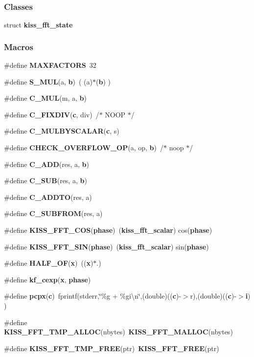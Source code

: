 \subsubsection*{Classes}
\begin{DoxyCompactItemize}
\item 
struct {\bf kiss\+\_\+fft\+\_\+state}
\end{DoxyCompactItemize}
\subsubsection*{Macros}
\begin{DoxyCompactItemize}
\item 
\#define {\bf M\+A\+X\+F\+A\+C\+T\+O\+RS}~32
\item 
\#define {\bf S\+\_\+\+M\+UL}(a,  {\bf b})~( (a)$\ast$({\bf b}) )
\item 
\#define {\bf C\+\_\+\+M\+UL}(m,  a,  {\bf b})
\item 
\#define {\bf C\+\_\+\+F\+I\+X\+D\+IV}({\bf c},  div)~/$\ast$ N\+O\+OP $\ast$/
\item 
\#define {\bf C\+\_\+\+M\+U\+L\+B\+Y\+S\+C\+A\+L\+AR}({\bf c},  s)
\item 
\#define {\bf C\+H\+E\+C\+K\+\_\+\+O\+V\+E\+R\+F\+L\+O\+W\+\_\+\+OP}(a,  op,  {\bf b})~/$\ast$ noop $\ast$/
\item 
\#define {\bf C\+\_\+\+A\+DD}(res,  a,  {\bf b})
\item 
\#define {\bf C\+\_\+\+S\+UB}(res,  a,  {\bf b})
\item 
\#define {\bf C\+\_\+\+A\+D\+D\+TO}(res,  a)
\item 
\#define {\bf C\+\_\+\+S\+U\+B\+F\+R\+OM}(res,  a)
\item 
\#define {\bf K\+I\+S\+S\+\_\+\+F\+F\+T\+\_\+\+C\+OS}({\bf phase})~({\bf kiss\+\_\+fft\+\_\+scalar}) cos({\bf phase})
\item 
\#define {\bf K\+I\+S\+S\+\_\+\+F\+F\+T\+\_\+\+S\+IN}({\bf phase})~({\bf kiss\+\_\+fft\+\_\+scalar}) sin({\bf phase})
\item 
\#define {\bf H\+A\+L\+F\+\_\+\+OF}({\bf x})~(({\bf x})$\ast$.)
\item 
\#define {\bf kf\+\_\+cexp}({\bf x},  {\bf phase})
\item 
\#define {\bf pcpx}({\bf c})~fprintf(stderr,\char`\"{}\%g + \%gi\textbackslash{}n\char`\"{},(double)(({\bf c})-\/$>$r),(double)(({\bf c})-\/$>${\bf i}) )
\item 
\#define {\bf K\+I\+S\+S\+\_\+\+F\+F\+T\+\_\+\+T\+M\+P\+\_\+\+A\+L\+L\+OC}(nbytes)~{\bf K\+I\+S\+S\+\_\+\+F\+F\+T\+\_\+\+M\+A\+L\+L\+OC}(nbytes)
\item 
\#define {\bf K\+I\+S\+S\+\_\+\+F\+F\+T\+\_\+\+T\+M\+P\+\_\+\+F\+R\+EE}(ptr)~{\bf K\+I\+S\+S\+\_\+\+F\+F\+T\+\_\+\+F\+R\+EE}(ptr)
\end{DoxyCompactItemize}


